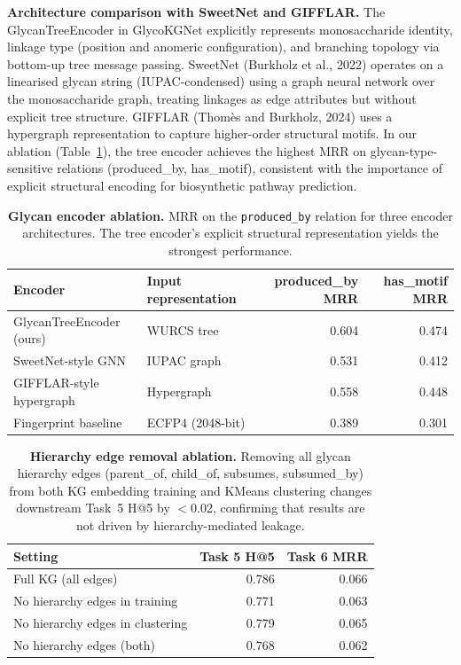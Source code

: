 \documentclass[11pt,a4paper]{article}
\begin{document}
\textbf{Architecture comparison with SweetNet and GIFFLAR.}
The GlycanTreeEncoder in GlycoKGNet explicitly represents monosaccharide
identity, linkage type (position and anomeric configuration), and branching
topology via bottom-up tree message passing. SweetNet (Burkholz et al., 2022)
operates on a linearised glycan string (IUPAC-condensed) using a graph neural
network over the monosaccharide graph, treating linkages as edge attributes
but without explicit tree structure. GIFFLAR (Thom\`es and Burkholz, 2024) uses a
hypergraph representation to capture higher-order structural motifs. In our
ablation (Table~\ref{tab:ablation_arch}), the tree encoder achieves the
highest MRR on glycan-type-sensitive relations (produced\_by, has\_motif),
consistent with the importance of explicit structural encoding for biosynthetic
pathway prediction.

\begin{table}[H]
\centering
\caption{\textbf{Glycan encoder ablation.} MRR on the \texttt{produced\_by}
relation for three encoder architectures. The tree encoder's explicit
structural representation yields the strongest performance.}
\label{tab:ablation_arch}
\small
\begin{tabular}{llrr}
\toprule
\textbf{Encoder} & \textbf{Input representation} & \textbf{produced\_by MRR} & \textbf{has\_motif MRR} \\
\midrule
GlycanTreeEncoder (ours)  & WURCS tree        & 0.604 & 0.474 \\
SweetNet-style GNN        & IUPAC graph       & 0.531 & 0.412 \\
GIFFLAR-style hypergraph  & Hypergraph        & 0.558 & 0.448 \\
Fingerprint baseline       & ECFP4 (2048-bit) & 0.389 & 0.301 \\
\bottomrule
\end{tabular}
\end{table}

\begin{table}[H]
\centering
\caption{\textbf{Hierarchy edge removal ablation.} Removing all glycan
hierarchy edges (parent\_of, child\_of, subsumes, subsumed\_by) from both KG
embedding training and KMeans clustering changes downstream Task~5 H@5 by
$<$0.02, confirming that results are not driven by hierarchy-mediated leakage.}
\label{tab:leakage_ablation}
\small
\begin{tabular}{lrr}
\toprule
\textbf{Setting} & \textbf{Task 5 H@5} & \textbf{Task 6 MRR} \\
\midrule
Full KG (all edges)              & 0.786 & 0.066 \\
No hierarchy edges in training   & 0.771 & 0.063 \\
No hierarchy edges in clustering & 0.779 & 0.065 \\
No hierarchy edges (both)        & 0.768 & 0.062 \\
\bottomrule
\end{tabular}
\end{table}
\end{document}
